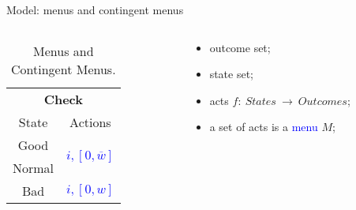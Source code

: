 \documentclass[usenames,dvipsnames,aspectratio=169,11pt, envcountsect, handout]{beamer}
\begin{document}
\begin{frame}{Model: menus and contingent menus}

	\begin{columns}
		\begin{column}{0.45\textwidth}  %
			\begin{center}
				\begin{table}[H]
					\centering
					\begin{tabular}{c | c}
						\multicolumn{2}{c}{\textbf{Check}}                                                  \\
						State  & Actions                                                                    \\
						\hline
						Good   & \multirow{2}{*}{\textcolor{blue}{\( i, \left[ 0, \overline{w} \right] \)}} \\
						Normal &                                                                            \\
						Bad    & \textcolor{blue}{\( i, \left[0, w \right] \)}                              \\
					\end{tabular}
					\caption{Menus and Contingent Menus.}
					\label{tab:menus2}
				\end{table}
			\end{center}
		\end{column}

		\begin{column}{0.55\textwidth}  %
			\begin{itemize}
				\item outcome set;
				\item state set;
				\item acts \( f : \: States \: \rightarrow \: Outcomes \);
				\item a set of acts is a \textcolor{blue}{menu} \( M \);
			\end{itemize}
		\end{column}
	\end{columns}

\end{frame}
\end{document}
